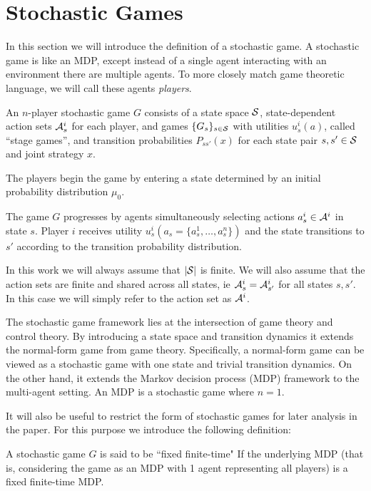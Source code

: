 \section{Stochastic Games}

In this section we will introduce the definition of a stochastic game. A stochastic game is like an MDP, except instead of a single agent interacting with an environment there are multiple agents. To more closely match game theoretic language, we will call these agents {\em players}.

\begin{mydef}
An $n$-player stochastic game $G$ consists of a state space $\SS$, state-dependent action sets $\AA^i_s$ for each player, and games $\{G_s\}_{s \in \SS}$ with utilities $u^i_s(a)$, called ``stage games'', and transition probabilities $P_{ss'}(x)$ for each state pair $s, s' \in \SS$ and joint strategy $x$. 

The players begin the game by entering a state determined by an initial probability distribution $\mu_0$. 

The game $G$ progresses by agents simultaneously selecting actions $a^i_s \in \AA^i$ in state $s$. Player $i$ receives utility $u^i_s(a_s = \{a^1_s, \ldots, a^n_s\})$ and the state transitions to $s'$ according to the transition probability distribution. 
\end{mydef}

In this work we will always assume that $| \SS |$ is finite. We will also assume that the action sets are finite and shared across all states, ie $\AA^i_s = \AA^i_{s'}$ for all states $s,s'$. In this case we will simply refer to the action set as $\AA^i$.

The stochastic game framework lies at the intersection of game theory and control theory. By introducing a state space and transition dynamics it extends the normal-form game from game theory. Specifically, a normal-form game can be viewed as a stochastic game with one state and trivial transition dynamics. On the other hand, it extends the Markov decision process (MDP) framework to the multi-agent setting. An MDP is a stochastic game where $n=1$. 

It will also be useful to restrict the form of stochastic games for later analysis in the paper. For this purpose we introduce the following definition:

\begin{mydef}
A stochastic game $G$ is said to be ``fixed finite-time" If the underlying MDP (that is, considering the game as an MDP with 1 agent representing all players) is a fixed finite-time MDP. 
\end{mydef}

